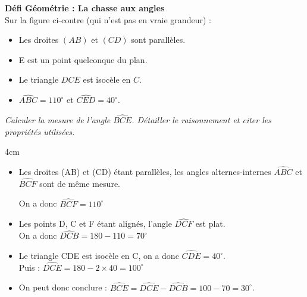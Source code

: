 \documentclass[a4paper]{book}
\begin{document}
{\begin{exercice}
\begin{minipage}{0.49\linewidth}
\begin{tikzpicture}[scale=1.2, >=latex]
            \end{tikzpicture}
        \end{minipage}
        \hfill
        \begin{minipage}{0.49\linewidth}
            \textbf{Défi Géométrie : La chasse aux angles} \\
            Sur la figure ci-contre (qui n'est pas en vraie grandeur) :
            \begin{itemize}
                \item Les droites $(AB)$ et $(CD)$ sont parallèles.
                \item E est un point quelconque du plan.
                \item Le triangle $DCE$ est isocèle en $C$.
                \item $\widehat{ABC} = 110^\circ$ et $\widehat{CED} = 40^\circ$.
            \end{itemize}
        \end{minipage}

        \textit{Calculer la mesure de l'angle $\widehat{BCE}$. Détailler le raisonnement et citer les propriétés utilisées.}   

        \begin{ZoneReponse}{4cm}
            \begin{itemize}[leftmargin=*]
                \item Les droites (AB) et (CD) étant parallèles, les angles alternes-internes $\widehat{ABC}$ et $\widehat{BCF}$ sont de même mesure. 
                
                On a donc $\widehat{BCF}=110^\circ$

                \item Les points D, C et F étant alignés, l'angle $\widehat{DCF}$ est plat.\\
                On a donc $\widehat{DCB}=180-110=70^\circ$

                \item Le triangle CDE est isocèle en C, on a donc $\widehat{CDE}=40^\circ$.\\
                Puis : $\widehat{DCE}=180-2\times40=100^\circ$

                \item On peut donc conclure : $\widehat{BCE}=\widehat{DCE}-\widehat{DCB}=100-70=30^\circ$.
            \end{itemize}       
        \end{ZoneReponse}
    \end{exercice}


}
\end{document}
